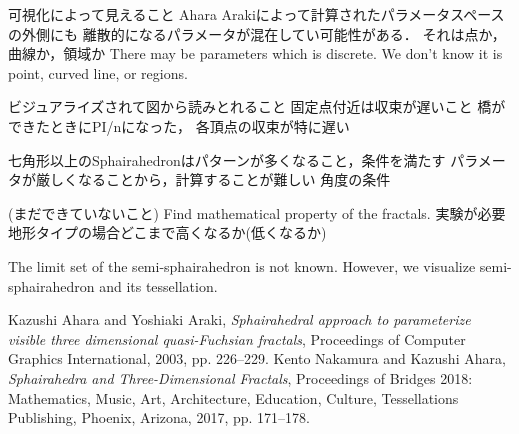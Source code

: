 \documentclass[dvipdfmx]{interact}
\theoremstyle{plain}%
\theoremstyle{definition}
\theoremstyle{remark}
\begin{document}
可視化によって見えること
Ahara Arakiによって計算されたパラメータスペースの外側にも
離散的になるパラメータが混在してい可能性がある．
それは点か，曲線か，領域か
There may be parameters which is discrete.
We don't know it is point, curved line, or regions.

ビジュアライズされて図から読みとれること
固定点付近は収束が遅いこと 橋ができたときにPI/nになった，
各頂点の収束が特に遅い

七角形以上のSphairahedronはパターンが多くなること，条件を満たす
パラメータが厳しくなることから，計算することが難しい
角度の条件


(まだできていないこと)
Find mathematical property of the fractals.
実験が必要
地形タイプの場合どこまで高くなるか(低くなるか)

The limit set of the semi-sphairahedron is not known.
However, we visualize semi-sphairahedron and its tessellation.



\begin{thebibliography}{99}
        Kazushi Ahara and Yoshiaki Araki,
        \emph{Sphairahedral approach to parameterize visible three
        dimensional quasi-Fuchsian fractals},
        Proceedings of Computer Graphics International, 2003, pp. 226--229.
        Kento Nakamura and Kazushi Ahara,
        \emph{Sphairahedra and Three-Dimensional Fractals}, 
        Proceedings of Bridges 2018: Mathematics, Music, Art, Architecture,
        Education, Culture, Tessellations Publishing,
        Phoenix, Arizona, 2017, pp. 171--178.
\end{thebibliography}
\end{document}
